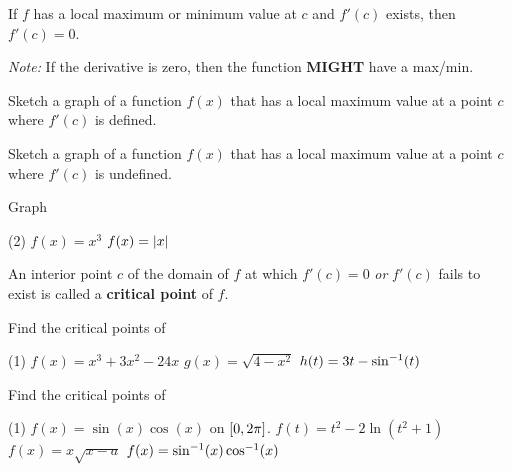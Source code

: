 \documentclass[../mathNotesPreamble]{subfiles}
\begin{document}
\begin{thmBox*}
  If $f$ has a local maximum or minimum value at $c$ and $f'(c)$ exists, then $f'(c)=0$.
\end{thmBox*}

\begin{center}
  \textit{Note:} If the derivative is zero, then the function \textbf{MIGHT} have a max/min.  
\end{center}

\begin{ex*}
  Sketch a graph of a function $f(x)$ that has a local maximum value at a point $c$ where $f'(c)$ is defined.
\end{ex*}
\begin{ex*}
  Sketch a graph of a function $f(x)$ that has a local maximum value at a point $c$ where $f'(c)$ is undefined.
\end{ex*}
\begin{ex*}
  Graph 
  \begin{tasks}(2)
    \task $f(x)=x^3$
    \task $f(x)={\left\vert x\right\vert}$
  \end{tasks}
\end{ex*}
\pagebreak
\begin{defn*}
  An interior point $c$ of the domain of $f$ at which $f'(c)=0$ \textit{or} $f'(c)$ fails to exist is called a \textbf{critical point} of $f$.
\end{defn*}
\begin{ex*}
  Find the critical points of
\end{ex*}
\begin{tasks}[after-item-skip=\stretch{1}, label=~](1)
  \task $f(x)=x^3+3x^2-24x$
  \task $g(x)=\sqrt{4-x^2}$
  \task $h(t)=3t-\sin^{-1}(t)$
\end{tasks}
\pagebreak
\begin{ex*}
  Find the critical points of
\end{ex*}
\begin{tasks}[after-item-skip=\stretch{1}, label=~](1)
  \task $f(x)=\sin(x)\cos(x)$ on ${\left[0,2\pi\right]}$. 
  \task $f(t)=t^2-2\ln(t^2+1)$
  \task $f(x)=x\sqrt{x-a}$
  \task $f(x)=\sin^{-1}(x)\cos^{-1}(x)$
\end{tasks}
\end{document}
